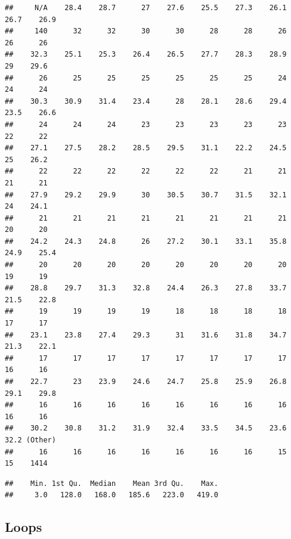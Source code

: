 \documentclass[
]{book}
\newenvironment{Shaded}{\begin{snugshade}}{\end{snugshade}}
\newcommand{\FunctionTok}[1]{\textcolor[rgb]{0.13,0.29,0.53}{\textbf{#1}}}
\newcommand{\NormalTok}[1]{#1}
\newcommand{\OtherTok}[1]{\textcolor[rgb]{0.56,0.35,0.01}{#1}}
\newcommand{\SpecialCharTok}[1]{\textcolor[rgb]{0.81,0.36,0.00}{\textbf{#1}}}
\begin{document}
\begin{verbatim}
##     N/A    28.4    28.7      27    27.6    25.5    27.3    26.1    26.7    26.9 
##     140      32      32      30      30      28      28      26      26      26 
##    32.3    25.1    25.3    26.4    26.5    27.7    28.3    28.9      29    29.6 
##      26      25      25      25      25      25      25      24      24      24 
##    30.3    30.9    31.4    23.4      28    28.1    28.6    29.4    23.5    26.6 
##      24      24      24      23      23      23      23      23      22      22 
##    27.1    27.5    28.2    28.5    29.5    31.1    22.2    24.5      25    26.2 
##      22      22      22      22      22      22      21      21      21      21 
##    27.9    29.2    29.9      30    30.5    30.7    31.5    32.1      24    24.1 
##      21      21      21      21      21      21      21      21      20      20 
##    24.2    24.3    24.8      26    27.2    30.1    33.1    35.8    24.9    25.4 
##      20      20      20      20      20      20      20      20      19      19 
##    28.8    29.7    31.3    32.8    24.4    26.3    27.8    33.7    21.5    22.8 
##      19      19      19      19      18      18      18      18      17      17 
##    23.1    23.8    27.4    29.3      31    31.6    31.8    34.7    21.3    22.1 
##      17      17      17      17      17      17      17      17      16      16 
##    22.7      23    23.9    24.6    24.7    25.8    25.9    26.8    29.1    29.8 
##      16      16      16      16      16      16      16      16      16      16 
##    30.2    30.8    31.2    31.9    32.4    33.5    34.5    23.6    32.2 (Other) 
##      16      16      16      16      16      16      16      15      15    1414
\end{verbatim}

\begin{Shaded}
\end{Shaded}

\begin{verbatim}
##    Min. 1st Qu.  Median    Mean 3rd Qu.    Max. 
##     3.0   128.0   168.0   185.6   223.0   419.0
\end{verbatim}

\subsection{Loops}\label{loops}
\end{document}

